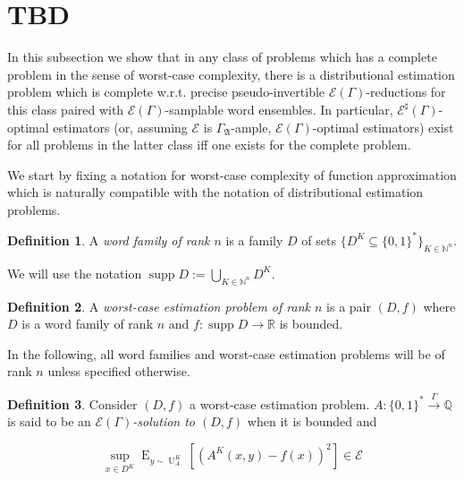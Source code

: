 \documentclass[a4paper]{article}
\numberwithin{equation}{section}
\theoremstyle{definition}
\newtheorem{definition}{Definition}[section]
\theoremstyle{plain}
\newcommand{\Bool}{\{0,1\}}
\newcommand{\Words}{{\Bool^*}}
\DeclareMathOperator{\Supp}{supp}
\DeclareMathOperator{\E}{E}
\DeclareMathOperator{\Un}{U}
\newcommand{\Nats}{\mathbb{N}}
\newcommand{\Rats}{\mathbb{Q}}
\newcommand{\Reals}{\mathbb{R}}
\newcommand{\GrowA}{\Gamma_{\mathfrak{A}}}
\newcommand{\Fall}{\mathcal{E}}
\newcommand{\EG}{\Fall(\Gamma)}
\newcommand{\ESG}{\Fall^\sharp(\Gamma)}
\newcommand{\Scheme}{\xrightarrow{\Gamma}}
\begin{document}
\section{TBD}

In this subsection we show that in any class of problems which has a complete problem in the sense of worst-case complexity, there is a distributional estimation problem which is complete w.r.t. precise pseudo-invertible ${\EG}$-reductions for this class paired with ${\EG}$-samplable word ensembles. In particular, ${\ESG}$-optimal estimators (or, assuming ${\Fall}$ is ${\GrowA}$-ample, ${\EG}$-optimal estimators) exist for all problems in the latter class iff one exists for the complete problem.

We start by fixing a notation for worst-case complexity of function approximation which is naturally compatible with the notation of distributional estimation problems.

\begin{samepage}
\begin{definition}

A \emph{word family of rank ${n}$} is a family ${D}$ of sets ${\{D^K \subseteq \Words\}_{K \in \Nats^n}}$.

We will use the notation ${\Supp D := \bigcup_{K \in \Nats^n} D^K}$.

\end{definition}
\end{samepage}

\begin{samepage}
\begin{definition}

A \emph{worst-case estimation problem of rank ${n}$} is a pair ${(D,f)}$ where ${D}$ is a word family of rank ${n}$ and ${f: \Supp D \rightarrow \Reals}$ is bounded.

\end{definition}
\end{samepage}

In the following, all word families and worst-case estimation problems will be of rank ${n}$ unless specified otherwise.

\begin{samepage}
\begin{definition}

Consider ${(D,f)}$ a worst-case estimation problem. ${A: \Words \Scheme \Rats}$ is said to be an \emph{${\EG}$-solution to ${(D,f)}$} when it is bounded and

\begin{equation}
\sup_{x \in D^K} \E_{y \sim \Un_A^K}[(A^K(x,y)-f(x))^2] \in \Fall
\end{equation}

\end{definition}
\end{samepage}
\end{document}

